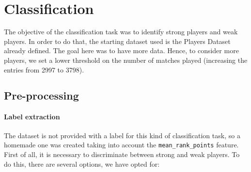 \section{Classification}



The objective of the classification task was to identify strong players and weak players. In order to do that, the starting dataset used is the Players Dataset already defined. The goal here was to have more data. Hence, to consider more players, we set a lower threshold on the number of matches played (increasing the entries from 2997 to 3798).

\subsection{Pre-processing}

\paragraph{Label extraction}
The dataset is not provided with a label for this kind of classification task, so a homemade one was created taking into account the \verb|mean_rank_points| feature. First of all, it is necessary to discriminate between strong and weak players. To do this, there are several options, we have opted for:

